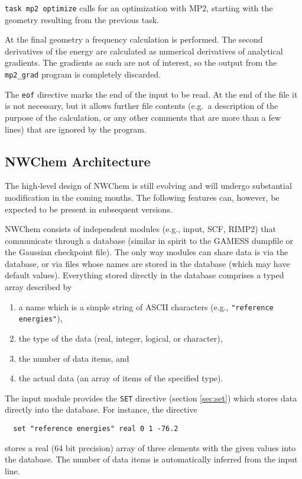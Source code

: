 {\tt task mp2 optimize} calls for an optimization with MP2, starting
with the geometry resulting from the previous task.

At the final geometry a frequency calculation is performed. The second
derivatives of the energy are calculated as numerical derivatives of
analytical gradients. The gradients as such are not of interest, so
the output from the {\tt mp2\_grad} program is completely discarded.

The {\tt eof} directive marks the end of the input to be read. At the
end of the file it is not necessary, but it allows further file
contents (e.g.\ a description of the purpose of the calculation, or
any other comments that are more than a few lines) that are ignored by
the program.

\subsection{NWChem Architecture}
\label{sec:arch}

The high-level design of NWChem is still evolving and will undergo
substantial modification in the coming months.  The following features
can, however, be expected to be present in subsequent versions.

NWChem consists of independent modules (e.g., input, SCF, RIMP2) that
communicate through a database (similar in spirit to the GAMESS
dumpfile or the Gaussian checkpoint file).  The only way modules can
share data is via the database, or via files whose names are stored in
the database (which may have default values).  Everything stored
directly in the database comprises a typed array described by
\begin{enumerate}
\item a name which is a simple string of ASCII characters (e.g., 
      \verb+"reference energies"+),
\item the type of the data (real, integer, logical, or character), 
\item the number of data items, and
\item the actual data (an array of items of the specified type).
\end{enumerate}

The input module provides the \verb+SET+ directive (section
\ref{sec:set}) which stores data directly into the database.  For
instance, the directive
\begin{verbatim}
  set "reference energies" real 0 1 -76.2
\end{verbatim}
stores a real (64 bit precision) array of three elements with the
given values into the database.  The number of data items is automatically
inferred from the input line.

